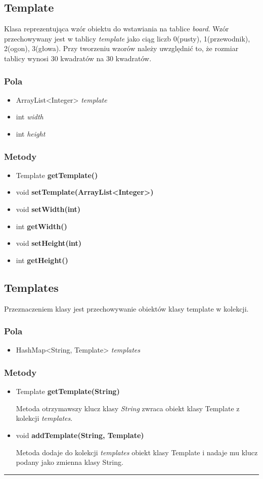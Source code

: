 \documentclass[a4paper,11pt]{article}
\newcommand{\linia}{\rule{\linewidth}{0.4mm}}
\begin{document}
\subsection{Template}
Klasa reprezentująca wzór obiektu do wstawiania na tablice \textit{board}. Wzór przechowywany jest w tablicy \textit{template} jako ciąg liczb 0(pusty), 1(przewodnik), 2(ogon), 3(głowa). Przy tworzeniu wzorów należy uwzględnić to, że rozmiar tablicy wynosi 30 kwadratów na 30 kwadratów. 
\subsubsection{Pola}
\begin{itemize}
\item ArrayList<Integer> \textit{template}
\item int \textit{width}
\item int \textit{height}
\end{itemize}

\subsubsection{Metody}
\begin{itemize}
\item Template \textbf{getTemplate()}
\item void \textbf{setTemplate(ArrayList<Integer>)}
\item void \textbf{setWidth(int)}
\item int \textbf{getWidth()}
\item void \textbf{setHeight(int)}
\item int \textbf{getHeight()}
\end{itemize}


\subsection{Templates}
Przeznaczeniem klasy jest przechowywanie obiektów klasy template w kolekcji.
\subsubsection{Pola}
\begin{itemize}
\item HashMap<String, Template> \textit{templates}
\end{itemize}
\subsubsection{Metody}
\begin{itemize}
\item Template \textbf{getTemplate(String)}

Metoda otrzymawszy klucz klasy \textit{String} zwraca obiekt klasy Template z kolekcji \textit{templates}.
\item void \textbf{addTemplate(String, Template)}

Metoda dodaje do kolekcji \textit{templates} obiekt klasy Template i nadaje mu klucz podany jako zmienna klasy String.
\end{itemize}
\noindent\linia
\end{document}
